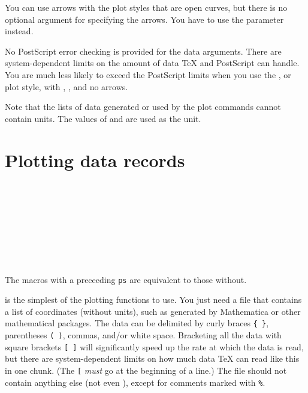 \documentclass[11pt,english,BCOR10mm,DIV12,bibliography=totoc,parskip=false,smallheadings
    headexclude,footexclude,oneside,dvipsnames,svgnames]{pst-doc}
\begin{document}
You can use arrows with the plot styles that are open curves, but there is no
optional argument for specifying the arrows. You have to use the 
parameter instead.

No\XInfoDanger{~} PostScript error checking is provided for the data arguments. %
There are system-dependent limits on the amount of data \TeX{} and PostScript
can handle. You are much less likely to exceed the PostScript limits when you
use the ,  or  plot style, with ,
, and no arrows.

Note that the lists of data generated or used by the plot commands cannot
contain units. The values of  and  are used as the unit.


\section{Plotting data records}

\begin{BDef}
 \OptArgs{}\\
 \OptArgs{}\\
 \OptArgs{}\\
 \OptArgs{}\\
 \\
 \\
 \\
\end{BDef}
The macros with a preceeding \verb|ps| are equivalent to those without.

 is the simplest of the plotting functions to use. You just need a
file that contains a list of coordinates (without units), such as generated by
Mathematica or other mathematical packages. The data can be delimited by curly
braces \verb|{ }|, parentheses \verb|( )|, commas, and/or white space. Bracketing
all the data with square brackets \verb|[ ]| will significantly speed up the rate
at which the data is read, but there are system-dependent limits on how much
data \TeX{} can read like this in one chunk. (The \verb|[| \emph{must} go at the
beginning of a line.) The file should not contain anything else (not even
), except for comments marked with \verb|%|.
\end{document}

